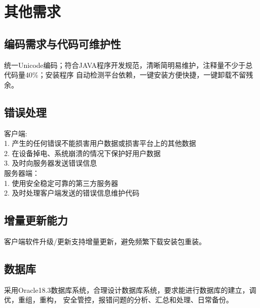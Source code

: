 \chapter{其他需求}
\section{编码需求与代码可维护性}
    统一Unicode编码；符合JAVA程序开发规范，清晰简明易维护，注释量不少于总代码量40\%；安装程序
    自动检测平台依赖，一键安装方便快捷，一键卸载不留残余。
\section{错误处理}
\noindent
    客户端: \\
        1. 产生的任何错误不能损害用户数据或损害平台上的其他数据\\
        2. 在设备掉电、系统崩溃的情况下保护好用户数据\\
        3. 及时向服务器发送错误信息\\
    服务器端：\\
        1. 使用安全稳定可靠的第三方服务器\\
        2. 及时处理客户端发送的错误信息维护代码
\section{增量更新能力}
    客户端软件升级/更新支持增量更新，避免频繁下载安装包重装。
\section{数据库}
    采用Oracle18.3数据库系统，合理设计数据库系统，要求能进行数据库的建立，调优，重组，重构，
    安全管控，报错问题的分析、汇总和处理、日常备份。
